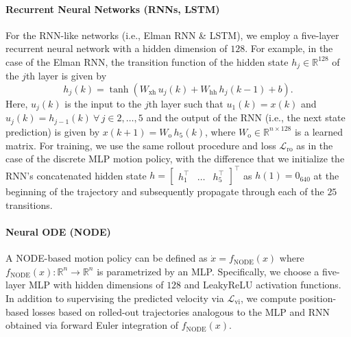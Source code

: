 \paragraph{Recurrent Neural Networks (RNNs, LSTM)}
For the \gls{RNN}-like networks (i.e., Elman \gls{RNN} \& \gls{LSTM}), we employ a five-layer recurrent neural network with a hidden dimension of $128$.
For example, in the case of the Elman \gls{RNN}, the transition function of the hidden state $h_j \in \mathbb{R}^{128}$ of the $j$th layer is given by
\begin{equation}
    h_j(k) = \tanh \left (W_\mathrm{xh} \, u_j(k) + W_\mathrm{hh} \, h_j(k-1) + b \right ).
\end{equation}
Here, $u_j(k)$ is the input to the $j$th layer such that $u_1(k) = x(k)$ and $u_j(k) = h_{j-1}(k) \: \forall \, j \in 2, \dots, 5$ and the output of the \gls{RNN} (i.e., the next state prediction) is given by $x(k+1) = W_\mathrm{o} \, h_5(k)$, where $W_\mathrm{o} \in \mathbb{R}^{n \times 128}$ is a learned matrix.
For training, we use the same rollout procedure and loss $\mathcal{L}_\mathrm{ro}$ as in the case of the discrete \gls{MLP} motion policy, with the difference that we initialize the \gls{RNN}'s concatenated hidden state $h = \begin{bmatrix}
    h_1^\top & \dots & h_5^\top
\end{bmatrix}^\top$ as $h(1) = 0_{640}$ at the beginning of the trajectory and subsequently propagate through each of the $25$ transitions. 

\paragraph{Neural ODE (NODE)}
A \gls{NODE}-based motion policy can be defined as $\dot{x} = f_\mathrm{NODE}(x)$ where $f_\mathrm{NODE}(x): \mathbb{R}^n \to \mathbb{R}^n$ is parametrized by an \gls{MLP}. Specifically, we choose a five-layer \gls{MLP} with hidden dimensions of $128$ and LeakyReLU activation functions.
In addition to supervising the predicted velocity via $\mathcal{L}_\mathrm{vi}$, we compute position-based losses based on rolled-out trajectories analogous to the \gls{MLP} and \gls{RNN} obtained via forward Euler integration of $f_\mathrm{NODE}(x)$.

